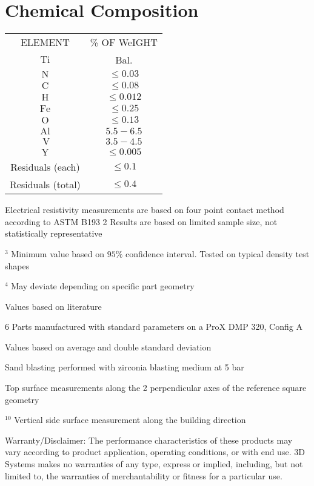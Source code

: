 \documentclass[10pt]{article}
\begin{document}
\section*{Chemical Composition}
\begin{center}
\begin{tabular}{cc}
ELEMENT & \% OF WeIGHT \\
$\mathrm{Ti}$ & Bal. \\
$\mathrm{N}$ & $\leq 0.03$ \\
$\mathrm{C}$ & $\leq 0.08$ \\
$\mathrm{H}$ & $\leq 0.012$ \\
$\mathrm{Fe}$ & $\leq 0.25$ \\
$\mathrm{O}$ & $\leq 0.13$ \\
$\mathrm{Al}$ & $5.5-6.5$ \\
$\mathrm{~V}$ & $3.5-4.5$ \\
$\mathrm{Y}$ & $\leq 0.005$ \\
Residuals (each) & $\leq 0.1$ \\
Residuals (total) & $\leq 0.4$ \\
\end{tabular}
\end{center}

Electrical resistivity measurements are based on four point contact method according to ASTM B193 2 Results are based on limited sample size, not statistically representative

${ }^{3}$ Minimum value based on $95 \%$ confidence interval. Tested on typical density test shapes

${ }^{4}$ May deviate depending on specific part geometry

Values based on literature

6 Parts manufactured with standard parameters on a ProX DMP 320, Config A

Values based on average and double standard deviation

Sand blasting performed with zirconia blasting medium at 5 bar

Top surface measurements along the 2 perpendicular axes of the reference square geometry

${ }^{10}$ Vertical side surface measurement along the building direction

Warranty/Disclaimer: The performance characteristics of these products may vary according to product application, operating conditions, or with end use. 3D Systems makes no warranties of any type, express or implied, including, but not limited to, the warranties of merchantability or fitness for a particular use.
\end{document}
